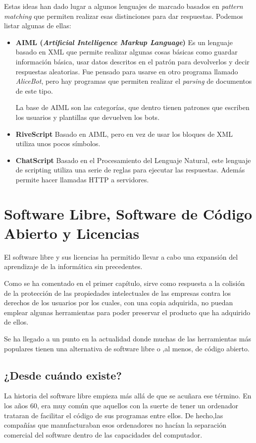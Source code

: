 Estas ideas han dado lugar a algunos lenguajes de marcado basados en \textit{pattern matching} que permiten realizar esas distinciones para dar respuestas. Podemos listar algunas de ellas:
\begin{itemize}
	\item \textbf{AIML (\textit{Artificial Intelligence Markup Language})} Es un lenguaje basado en XML que permite realizar algunas cosas básicas como guardar información básica, usar datos descritos en el patrón para devolverlos y decir respuestas aleatorias. Fue pensado para usarse en otro programa llamado \textit{AliceBot}, pero hay programas que permiten realizar el \textit{parsing} de documentos de este tipo.
	
	La base de AIML son las categorías, que dentro tienen patrones que escriben los usuarios y plantillas que devuelven los bots.
	
	\item \textbf{RiveScript} Basado en AIML, pero en vez de usar los bloques de XML utiliza unos pocos símbolos.
	
	\item \textbf{ChatScript} Basado en el Procesamiento del Lenguaje Natural, este lenguaje de scripting utiliza una serie de reglas para ejecutar las respuestas. Además permite hacer llamadas HTTP a servidores.
\end{itemize}

\section{Software Libre, Software de Código Abierto y Licencias}
El software libre y sus licencias \cite{gplv3} ha permitido llevar a cabo una expansión del aprendizaje de la informática sin precedentes. 

Como se ha comentado en el primer capítulo, sirve como respuesta a la colisión de la protección de las propiedades intelectuales de las empresas contra los derechos de los usuarios por los cuales, con una copia adquirida, no puedan emplear algunas herramientas para poder preservar el producto que ha adquirido de ellos.

Se ha llegado a un punto en la actualidad donde muchas de las herramientas más populares tienen una alternativa de software libre o ,al menos, de código abierto.

\subsection{¿Desde cuándo existe?}
La historia del software libre empieza más allá de que se acuñara ese término. En los años 60, era muy común que aquellos con la suerte de tener un ordenador trataran de facilitar el código de sus programas entre ellos. De hecho,las compañías que manufacturaban esos ordenadores no hacían la separación comercial del software dentro de las capacidades del computador.

